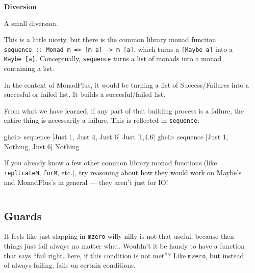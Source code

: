 \documentclass[]{article}
\newenvironment{Shaded}{}{}
\newcommand{\DataTypeTok}[1]{\textcolor[rgb]{0.56,0.13,0.00}{{#1}}}
\newcommand{\DecValTok}[1]{\textcolor[rgb]{0.25,0.63,0.44}{{#1}}}
\newcommand{\FunctionTok}[1]{\textcolor[rgb]{0.02,0.16,0.49}{{#1}}}
\newcommand{\NormalTok}[1]{{#1}}
\begin{document}
\textbf{Diversion}

A small diversion.

This is a little nicety, but there is the common library monad function
\texttt{sequence\ ::\ Monad\ m\ =\textgreater{}\ {[}m\ a{]}\ -\textgreater{}\ m\ {[}a{]}},
which turns a \texttt{{[}Maybe\ a{]}} into a \texttt{Maybe\ {[}a{]}}.
Conceptually, \texttt{sequence} turns a list of monads into a monad
containing a list.

In the context of MonadPlus, it would be turning a list of
Success/Failures into a succesful or failed list. It builds a
succesful/failed list.

From what we have learned, if any part of that building process is a
failure, the entire thing is necessarily a failure. This is reflected in
\texttt{sequence}:

\begin{Shaded}
\begin{Highlighting}[]
\NormalTok{ghci}\FunctionTok{>} \NormalTok{sequence [}\DataTypeTok{Just} \DecValTok{1}\NormalTok{, }\DataTypeTok{Just} \DecValTok{4}\NormalTok{, }\DataTypeTok{Just} \DecValTok{6}\NormalTok{]}
\DataTypeTok{Just} \NormalTok{[}\DecValTok{1}\NormalTok{,}\DecValTok{4}\NormalTok{,}\DecValTok{6}\NormalTok{]}
\NormalTok{ghci}\FunctionTok{>} \NormalTok{sequence [}\DataTypeTok{Just} \DecValTok{1}\NormalTok{, }\DataTypeTok{Nothing}\NormalTok{, }\DataTypeTok{Just} \DecValTok{6}\NormalTok{]}
\DataTypeTok{Nothing}
\end{Highlighting}
\end{Shaded}

If you already know a few other common library monad functions (like
\texttt{replicateM}, \texttt{forM}, etc.), try reasoning about how they
would work on Maybe's and MonadPlus's in general --- they aren't just
for IO!

\begin{center}\rule{0.5\linewidth}{\linethickness}\end{center}

\subsection{Guards}\label{guards}

It feels like just slapping in \texttt{mzero} willy-nilly is not that
useful, because then things just fail always no matter what. Wouldn't it
be handy to have a function that says ``fail right\ldots{}here, if this
condition is not met''? Like \texttt{mzero}, but instead of always
failing, fails on certain conditions.
\end{document}
